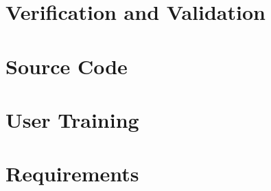 \documentclass{simcenterdocumentation}
\begin{document}
\chapter{Verification and Validation} \label{vv}
\label{chap:vnv}


\chapter{Source Code}
\label{chap:SourceCode}


\chapter{User Training} \label{training}
\label{chap:training}


\chapter{Requirements} \label{requirements}
\label{chap:requirements}



\nocite{*}


\pagestyle{plain}
{
  \renewcommand{\thispagestyle}[1]{}	
  \printbibliography           
}
\end{document}
